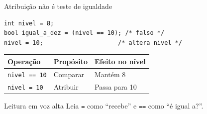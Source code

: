 \begin{frame}[fragile]{Atribuição não é teste de igualdade}
\begin{lstlisting}
int nivel = 8;
bool igual_a_dez = (nivel == 10); /* falso */
nivel = 10;                     /* altera nivel */
\end{lstlisting}
\begin{center}
\begin{tabular}{lll}
\toprule
Operação & Propósito & Efeito no nível \\
\midrule
\texttt{nivel == 10} & Comparar & Mantém 8 \\
\texttt{nivel = 10} & Atribuir & Passa para 10 \\
\bottomrule
\end{tabular}
\end{center}
\begin{block}{Leitura em voz alta}
Leia \texttt{=} como ``recebe'' e \texttt{==} como ``é igual a?''.
\end{block}
\end{frame}
